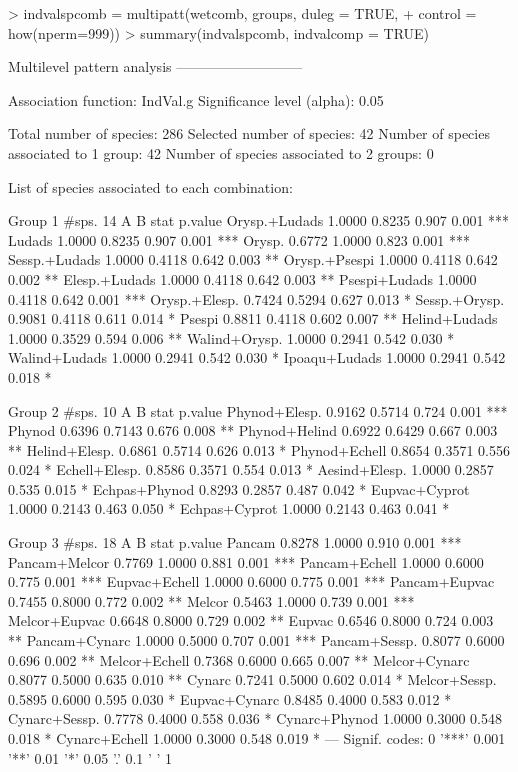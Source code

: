 \documentclass[11pt,a4paper]{article}
\begin{document}
\begin{Schunk}
\begin{Sinput}
> indvalspcomb = multipatt(wetcomb, groups, duleg = TRUE, 
+                        control = how(nperm=999))
> summary(indvalspcomb, indvalcomp = TRUE)
\end{Sinput}
\begin{Soutput}
 Multilevel pattern analysis
 ---------------------------

 Association function: IndVal.g
 Significance level (alpha): 0.05

 Total number of species: 286
 Selected number of species: 42 
 Number of species associated to 1 group: 42 
 Number of species associated to 2 groups: 0 

 List of species associated to each combination: 

 Group 1  #sps.  14 
                   A      B  stat p.value    
Orysp.+Ludads 1.0000 0.8235 0.907   0.001 ***
Ludads        1.0000 0.8235 0.907   0.001 ***
Orysp.        0.6772 1.0000 0.823   0.001 ***
Sessp.+Ludads 1.0000 0.4118 0.642   0.003 ** 
Orysp.+Psespi 1.0000 0.4118 0.642   0.002 ** 
Elesp.+Ludads 1.0000 0.4118 0.642   0.003 ** 
Psespi+Ludads 1.0000 0.4118 0.642   0.001 ***
Orysp.+Elesp. 0.7424 0.5294 0.627   0.013 *  
Sessp.+Orysp. 0.9081 0.4118 0.611   0.014 *  
Psespi        0.8811 0.4118 0.602   0.007 ** 
Helind+Ludads 1.0000 0.3529 0.594   0.006 ** 
Walind+Orysp. 1.0000 0.2941 0.542   0.030 *  
Walind+Ludads 1.0000 0.2941 0.542   0.030 *  
Ipoaqu+Ludads 1.0000 0.2941 0.542   0.018 *  

 Group 2  #sps.  10 
                   A      B  stat p.value    
Phynod+Elesp. 0.9162 0.5714 0.724   0.001 ***
Phynod        0.6396 0.7143 0.676   0.008 ** 
Phynod+Helind 0.6922 0.6429 0.667   0.003 ** 
Helind+Elesp. 0.6861 0.5714 0.626   0.013 *  
Phynod+Echell 0.8654 0.3571 0.556   0.024 *  
Echell+Elesp. 0.8586 0.3571 0.554   0.013 *  
Aesind+Elesp. 1.0000 0.2857 0.535   0.015 *  
Echpas+Phynod 0.8293 0.2857 0.487   0.042 *  
Eupvac+Cyprot 1.0000 0.2143 0.463   0.050 *  
Echpas+Cyprot 1.0000 0.2143 0.463   0.041 *  

 Group 3  #sps.  18 
                   A      B  stat p.value    
Pancam        0.8278 1.0000 0.910   0.001 ***
Pancam+Melcor 0.7769 1.0000 0.881   0.001 ***
Pancam+Echell 1.0000 0.6000 0.775   0.001 ***
Eupvac+Echell 1.0000 0.6000 0.775   0.001 ***
Pancam+Eupvac 0.7455 0.8000 0.772   0.002 ** 
Melcor        0.5463 1.0000 0.739   0.001 ***
Melcor+Eupvac 0.6648 0.8000 0.729   0.002 ** 
Eupvac        0.6546 0.8000 0.724   0.003 ** 
Pancam+Cynarc 1.0000 0.5000 0.707   0.001 ***
Pancam+Sessp. 0.8077 0.6000 0.696   0.002 ** 
Melcor+Echell 0.7368 0.6000 0.665   0.007 ** 
Melcor+Cynarc 0.8077 0.5000 0.635   0.010 ** 
Cynarc        0.7241 0.5000 0.602   0.014 *  
Melcor+Sessp. 0.5895 0.6000 0.595   0.030 *  
Eupvac+Cynarc 0.8485 0.4000 0.583   0.012 *  
Cynarc+Sessp. 0.7778 0.4000 0.558   0.036 *  
Cynarc+Phynod 1.0000 0.3000 0.548   0.018 *  
Cynarc+Echell 1.0000 0.3000 0.548   0.019 *  
---
Signif. codes:  0 '***' 0.001 '**' 0.01 '*' 0.05 '.' 0.1 ' ' 1 
\end{Soutput}
\end{Schunk}
\end{document}
